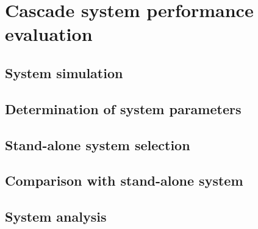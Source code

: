 \chapter{Cascade system performance evaluation}
\section{System simulation}
\section{Determination of system parameters}
\section{Stand-alone system selection}
\section{Comparison with stand-alone system}
\section{System analysis}